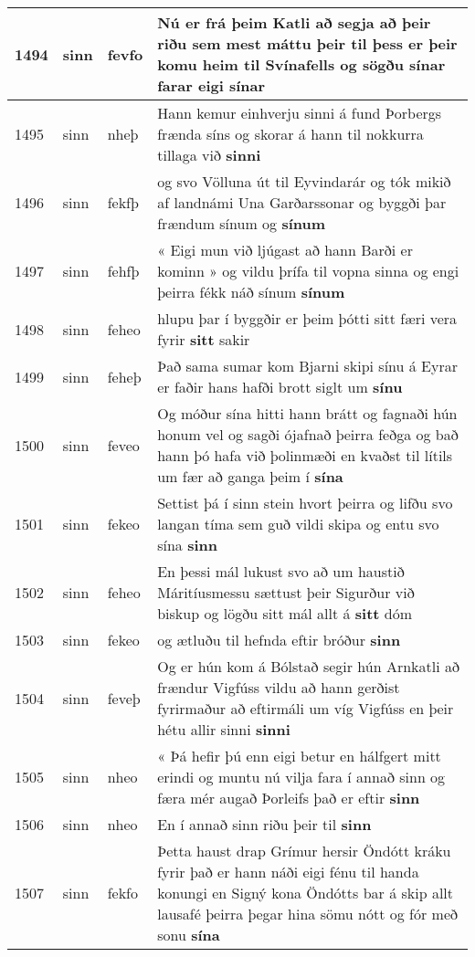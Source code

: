 \documentclass{article}
\begin{document}
\begin{longtable}{p{1cm}|p{1cm}|p{1cm}|p{13cm}}
\hline
1494&sinn&fevfo&Nú er frá þeim Katli að segja að þeir riðu sem mest máttu þeir til þess er þeir komu heim til Svínafells og sögðu sínar farar eigi \textbf{sínar} \\
\hline
1495&sinn&nheþ&Hann kemur einhverju sinni á fund Þorbergs frænda síns og skorar á hann til nokkurra tillaga við \textbf{sinni} \\
\hline
1496&sinn&fekfþ&og svo Völluna út til Eyvindarár og tók mikið af landnámi Una Garðarssonar og byggði þar frændum sínum og \textbf{sínum} \\
\hline
1497&sinn&fehfþ&« Eigi mun við ljúgast að hann Barði er kominn » og vildu þrífa til vopna sinna og engi þeirra fékk náð sínum \textbf{sínum} \\
\hline
1498&sinn&feheo&hlupu þar í byggðir er þeim þótti sitt færi vera fyrir \textbf{sitt} sakir\\
\hline
1499&sinn&feheþ&Það sama sumar kom Bjarni skipi sínu á Eyrar er faðir hans hafði brott siglt um \textbf{sínu} \\
\hline
1500&sinn&feveo&Og móður sína hitti hann brátt og fagnaði hún honum vel og sagði ójafnað þeirra feðga og bað hann þó hafa við þolinmæði en kvaðst til lítils um fær að ganga þeim í \textbf{sína} \\
\hline
1501&sinn&fekeo&Settist þá í sinn stein hvort þeirra og lifðu svo langan tíma sem guð vildi skipa og entu svo sína \textbf{sinn} \\
\hline
1502&sinn&feheo&En þessi mál lukust svo að um haustið Máritíusmessu sættust þeir Sigurður við biskup og lögðu sitt mál allt á \textbf{sitt} dóm\\
\hline
1503&sinn&fekeo&og ætluðu til hefnda eftir bróður \textbf{sinn} \\
\hline
1504&sinn&feveþ&Og er hún kom á Bólstað segir hún Arnkatli að frændur Vigfúss vildu að hann gerðist fyrirmaður að eftirmáli um víg Vigfúss en þeir hétu allir sinni \textbf{sinni} \\
\hline
1505&sinn&nheo&« Þá hefir þú enn eigi betur en hálfgert mitt erindi og muntu nú vilja fara í annað sinn og færa mér augað Þorleifs það er eftir \textbf{sinn} \\
\hline
1506&sinn&nheo&En í annað sinn riðu þeir til \textbf{sinn} \\
\hline
1507&sinn&fekfo&Þetta haust drap Grímur hersir Öndótt kráku fyrir það er hann náði eigi fénu til handa konungi en Signý kona Öndótts bar á skip allt lausafé þeirra þegar hina sömu nótt og fór með sonu \textbf{sína} \\

\end{longtable}
\end{document}
